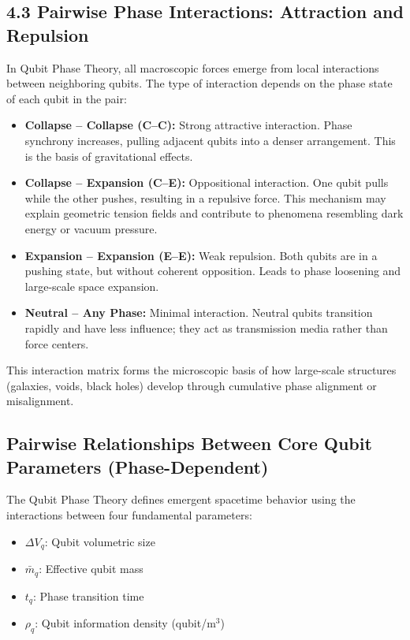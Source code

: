 \documentclass[12pt]{report} %
\begin{document}
\subsection*{4.3 Pairwise Phase Interactions: Attraction and Repulsion}

In Qubit Phase Theory, all macroscopic forces emerge from local interactions between neighboring qubits. The type of interaction depends on the phase state of each qubit in the pair:

\begin{itemize}
  \item \textbf{Collapse – Collapse (C–C):} Strong attractive interaction. Phase synchrony increases, pulling adjacent qubits into a denser arrangement. This is the basis of gravitational effects.
  
  \item \textbf{Collapse – Expansion (C–E):} Oppositional interaction. One qubit pulls while the other pushes, resulting in a repulsive force. This mechanism may explain geometric tension fields and contribute to phenomena resembling dark energy or vacuum pressure.

  \item \textbf{Expansion – Expansion (E–E):} Weak repulsion. Both qubits are in a pushing state, but without coherent opposition. Leads to phase loosening and large-scale space expansion.

  \item \textbf{Neutral – Any Phase:} Minimal interaction. Neutral qubits transition rapidly and have less influence; they act as transmission media rather than force centers.
\end{itemize}

This interaction matrix forms the microscopic basis of how large-scale structures (galaxies, voids, black holes) develop through cumulative phase alignment or misalignment.


\subsection*{Pairwise Relationships Between Core Qubit Parameters (Phase-Dependent)}

The Qubit Phase Theory defines emergent spacetime behavior using the interactions between four fundamental parameters:

\begin{itemize}
  \item $\Delta V_q$: Qubit volumetric size
  \item $\bar{m}_q$: Effective qubit mass
  \item $t_q$: Phase transition time
  \item $\rho_q$: Qubit information density (qubit/m$^3$)
\end{itemize}
\end{document}
